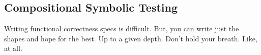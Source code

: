 \subsection{Compositional Symbolic Testing}
Writing functional correctness specs is difficult. But, you can write just the shapes and hope for the best. Up to a given depth. Don't hold your breath. Like, at all.

\newpage


%
%
%
